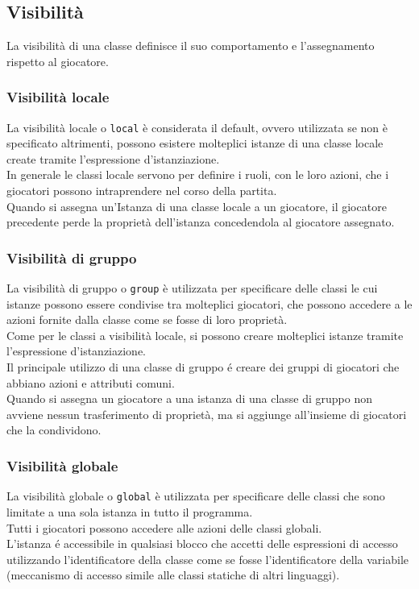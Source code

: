 \subsection{Visibilità} \label{VisibilitaClasse}
La visibilità di una classe definisce il suo comportamento e l'assegnamento rispetto al giocatore.

\subsubsection{Visibilità locale}
La visibilità locale o \lstinline|local| è considerata il default, ovvero utilizzata se non è specificato
altrimenti, possono esistere molteplici istanze di una classe locale create tramite l'espressione d'istanziazione. \\
In generale le classi locale servono per definire i ruoli, con le loro azioni, che i giocatori possono
intraprendere nel corso della partita. \\
Quando si assegna un'Istanza di una classe locale a un giocatore, il giocatore precedente perde la proprietà dell'istanza
concedendola al giocatore assegnato.

\subsubsection{Visibilità di gruppo}
La visibilità di gruppo o \lstinline|group| è utilizzata per specificare delle classi le cui istanze possono
essere condivise tra molteplici giocatori, che possono accedere a le azioni fornite dalla classe come 
se fosse di loro proprietà. \\
Come per le classi a visibilità locale, si possono creare molteplici istanze tramite l'espressione d'istanziazione. \\
Il principale utilizzo di una classe di gruppo é creare dei gruppi di giocatori che abbiano
azioni e attributi comuni. \\
Quando si assegna un giocatore a una istanza di una classe di gruppo non avviene nessun trasferimento
di proprietà, ma si aggiunge all'insieme di giocatori che la condividono.

\subsubsection{Visibilità globale}
La visibilità globale o \lstinline|global| è utilizzata per specificare delle classi che sono 
limitate a una sola istanza in tutto il programma. \\
Tutti i giocatori possono accedere alle azioni delle classi globali. \\
L'istanza é accessibile in qualsiasi blocco che accetti delle espressioni di accesso utilizzando 
l'identificatore della classe come se fosse l'identificatore della variabile (meccanismo di accesso 
simile alle classi statiche di altri linguaggi).

